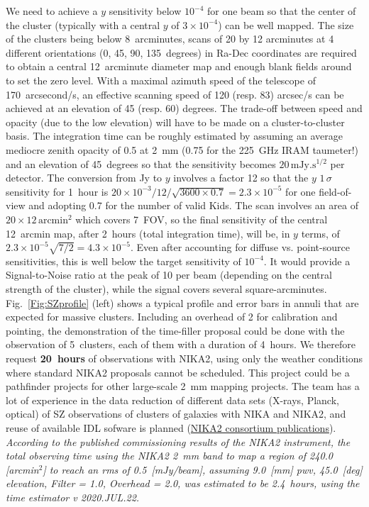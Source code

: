 \documentclass[10pt,a4paper,twoside,graphicx,color]{article}
\begin{document}
We need to achieve a $y$ sensitivity below $10^{-4}$ for one beam so
that the center of the cluster (typically with a central $y$ of
$3\times 10^{-4}$) can be well mapped. The size of the clusters being
below 8~arcminutes, scans of 20 by 12 arcminutes at 4 different
orientations (0, 45, 90, 135~degrees) in Ra-Dec coordinates are
required to obtain a central 12~arcminute diameter map and enough
blank fields around to set the zero level. With a maximal azimuth
speed of the telescope of 170~arcsecond/s, an effective scanning speed
of 120 (resp. 83) arcsec/s can be achieved at an elevation of 45
(resp. 60) degrees. The trade-off between speed and opacity (due to
the low elevation) will have to be made on a cluster-to-cluster
basis. The integration time can be roughly estimated by assuming an
average mediocre zenith opacity of 0.5 at 2~mm (0.75 for the 225~GHz
IRAM taumeter!) and an elevation of 45~degrees so that the sensitivity
becomes $20\,\mathrm{mJy.s^{1/2}}$ per detector. The conversion from
Jy to $y$ involves a factor 12 so that the $y$ $1\,\sigma$ sensitivity
for 1~hour is $20\times 10^{-3}/12/\sqrt{3600\times 0.7}=2.3\times
10^{-5}$ for one field-of-view and adopting 0.7 for the number of
valid Kids. The scan involves an area of $20\times
12\,\mathrm{arcmin^2}$ which covers 7~FOV, so the final sensitivity of
the central 12~arcmin map, after 2~hours (total integration time),
will be, in $y$ terms, of $2.3\times 10^{-5}\sqrt{7/2}=4.3\times
10^{-5}$. Even after accounting for diffuse vs. point-source
sensitivities, this is well below the target sensitivity of
$10^{-4}$. It would provide a Signal-to-Noise ratio at the peak of 10
per beam (depending on the central strength of the cluster), while the
signal covers several square-arcminutes. Fig.~\ref{Fig:SZprofile}
(left) shows a typical profile and error bars in annuli that are
expected for massive clusters. Including an overhead of 2 for
calibration and pointing, the demonstration of the time-filler
proposal could be done with the observation of 5~clusters, each of
them with a duration of 4~hours. We therefore request {\bf 20~hours}
of observations with NIKA2, using only the weather conditions where
standard NIKA2 proposals cannot be scheduled. This project could be a
pathfinder projects for other large-scale 2~mm mapping projects. The
team has a lot of experience in the data reduction of different data
sets (X-rays, Planck, optical) of SZ observations of clusters of
galaxies with NIKA and NIKA2, and reuse of available IDL sofware is
planned (\href{https://ipag.osug.fr/nika2/Publications.html}{NIKA2
  consortium publications}).  {\sl According to the published
  commissioning results of the NIKA2 instrument, the total observing
  time using the NIKA2 2~mm band to map a region of 240.0 [arcmin$^2$]
  to reach an rms of 0.5~[mJy/beam], assuming 9.0~[mm] pwv, 45.0~[deg]
  elevation, Filter = 1.0, Overhead = 2.0, was estimated to be 2.4~hours, using the time estimator v 2020.JUL.22.}
\end{document}
